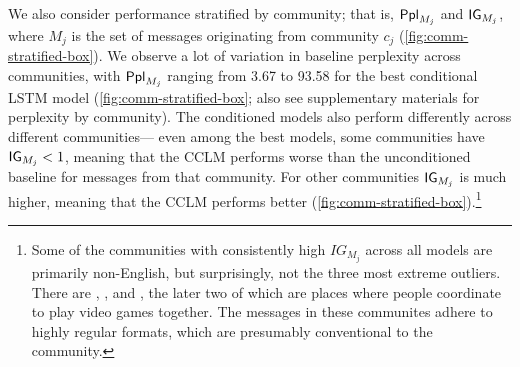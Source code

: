 \documentclass[11pt]{article}
\begin{document}
We also consider performance stratified by community; that is,
$\mathsf{Ppl}_{M_j}$ and $\mathsf{IG}_{M_j}$, 
where $M_j$ is the set of messages originating from community $c_j$ 
(\cref{fig:comm-stratified-box}).
We observe a lot of variation in baseline perplexity
across communities, with $\mathsf{Ppl}_{M_j}$ ranging from \num{3.67} to
\num{93.58} for the best conditional LSTM model 
(\cref{fig:comm-stratified-box}; also see supplementary materials for perplexity by community). 
The conditioned models also perform differently across different communities---%
even among the best models, some communities have $\mathsf{IG}_{M_j} < 1$,
meaning that the CCLM performs worse than the unconditioned baseline for 
messages from that community.
For other communities $\mathsf{IG}_{M_j}$ is much higher, meaning that the CCLM performs better  
(\cref{fig:comm-stratified-box}).\footnote{
  Some of the communities with consistently high $IG_{M_j}$ 
  across all models are primarily non-English, 
  but surprisingly, not the three most extreme
  outliers. There are , , and , 
  the later two of which are places where people coordinate to play video games
  together. The messages in these communites adhere to highly regular formats, 
  which are presumably conventional to the community.}
%
\end{document}
